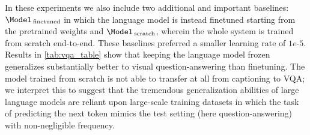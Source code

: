 In these experiments we also include two additional and important baselines: $\text{\Model}_{\,\text{finetuned}}$ in which the language model is instead finetuned starting from the pretrained weights and $\text{\Model}_{\,\text{scratch}}$, wherein the whole system is trained from scratch end-to-end. These baselines preferred a smaller learning rate of $1e\text{-}5$. Results in \autoref{tab:vqa_table} show that keeping the language model frozen generalizes substantially better to visual question-answering than finetuning. The model trained from scratch is not able to transfer at all from captioning to VQA; we interpret this to suggest that the tremendous generalization abilities of large language models are reliant upon large-scale training datasets in which the task of predicting the next token mimics the test setting (here question-answering) with non-negligible frequency.

